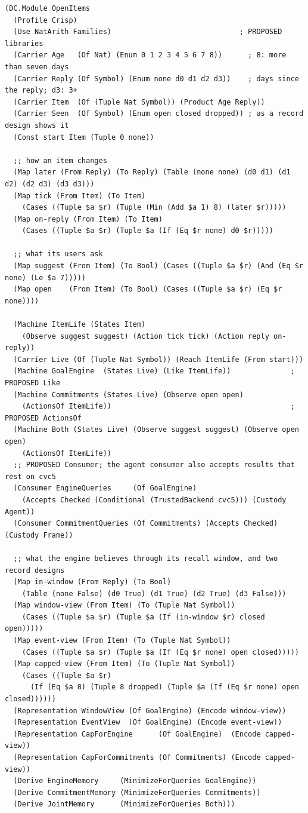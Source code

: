\documentclass[11pt]{article}
\theoremstyle{definition}
\theoremstyle{plain}
\begin{document}
\begin{lstlisting}[style=mettamod]
(DC.Module OpenItems
  (Profile Crisp)
  (Use NatArith Families)                              ; PROPOSED libraries
  (Carrier Age   (Of Nat) (Enum 0 1 2 3 4 5 6 7 8))      ; 8: more than seven days
  (Carrier Reply (Of Symbol) (Enum none d0 d1 d2 d3))    ; days since the reply; d3: 3+
  (Carrier Item  (Of (Tuple Nat Symbol)) (Product Age Reply))
  (Carrier Seen  (Of Symbol) (Enum open closed dropped)) ; as a record design shows it
  (Const start Item (Tuple 0 none))

  ;; how an item changes
  (Map later (From Reply) (To Reply) (Table (none none) (d0 d1) (d1 d2) (d2 d3) (d3 d3)))
  (Map tick (From Item) (To Item)
    (Cases ((Tuple $a $r) (Tuple (Min (Add $a 1) 8) (later $r)))))
  (Map on-reply (From Item) (To Item)
    (Cases ((Tuple $a $r) (Tuple $a (If (Eq $r none) d0 $r)))))

  ;; what its users ask
  (Map suggest (From Item) (To Bool) (Cases ((Tuple $a $r) (And (Eq $r none) (Le $a 7)))))
  (Map open    (From Item) (To Bool) (Cases ((Tuple $a $r) (Eq $r none))))

  (Machine ItemLife (States Item)
    (Observe suggest suggest) (Action tick tick) (Action reply on-reply))
  (Carrier Live (Of (Tuple Nat Symbol)) (Reach ItemLife (From start)))
  (Machine GoalEngine  (States Live) (Like ItemLife))              ; PROPOSED Like
  (Machine Commitments (States Live) (Observe open open)
    (ActionsOf ItemLife))                                          ; PROPOSED ActionsOf
  (Machine Both (States Live) (Observe suggest suggest) (Observe open open)
    (ActionsOf ItemLife))
  ;; PROPOSED Consumer; the agent consumer also accepts results that rest on cvc5
  (Consumer EngineQueries     (Of GoalEngine)
    (Accepts Checked (Conditional (TrustedBackend cvc5))) (Custody Agent))
  (Consumer CommitmentQueries (Of Commitments) (Accepts Checked) (Custody Frame))

  ;; what the engine believes through its recall window, and two record designs
  (Map in-window (From Reply) (To Bool)
    (Table (none False) (d0 True) (d1 True) (d2 True) (d3 False)))
  (Map window-view (From Item) (To (Tuple Nat Symbol))
    (Cases ((Tuple $a $r) (Tuple $a (If (in-window $r) closed open)))))
  (Map event-view (From Item) (To (Tuple Nat Symbol))
    (Cases ((Tuple $a $r) (Tuple $a (If (Eq $r none) open closed)))))
  (Map capped-view (From Item) (To (Tuple Nat Symbol))
    (Cases ((Tuple $a $r)
      (If (Eq $a 8) (Tuple 8 dropped) (Tuple $a (If (Eq $r none) open closed))))))
  (Representation WindowView (Of GoalEngine) (Encode window-view))
  (Representation EventView  (Of GoalEngine) (Encode event-view))
  (Representation CapForEngine      (Of GoalEngine)  (Encode capped-view))
  (Representation CapForCommitments (Of Commitments) (Encode capped-view))
  (Derive EngineMemory     (MinimizeForQueries GoalEngine))
  (Derive CommitmentMemory (MinimizeForQueries Commitments))
  (Derive JointMemory      (MinimizeForQueries Both)))
\end{lstlisting}
\end{document}
